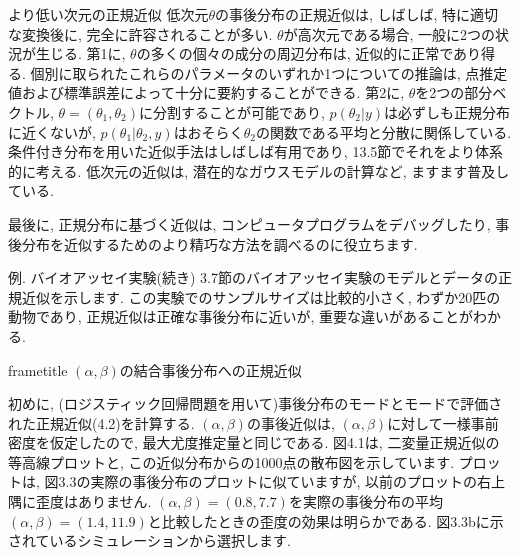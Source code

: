 \documentclass[10pt,dvipdfmx,a4]{beamer}
\newcommand{\dbox}[1]{\begin{beamercolorbox}[wd=122mm, sep=0pt, shadow=false, rounded=false]{frametitle} { #1}\end{beamercolorbox}}
\begin{document}
\begin{frame}{より低い次元の正規近似}
低次元$\theta$の事後分布の正規近似は, しばしば, 特に適切な変換後に, 完全に許容されることが多い.
$\theta$が高次元である場合, 一般に2つの状況が生じる.
第1に, $\theta$の多くの個々の成分の周辺分布は, 近似的に正常であり得る.
個別に取られたこれらのパラメータのいずれか1つについての推論は, 点推定値および標準誤差によって十分に要約することができる.
第2に, $\theta$を2つの部分ベクトル, $\theta=(\theta_1, \theta_2)$に分割することが可能であり, $p(\theta_2|y)$は必ずしも正規分布に近くないが, $p(\theta_1|\theta_2, y)$はおそらく$\theta_2$の関数である平均と分散に関係している.
条件付き分布を用いた近似手法はしばしば有用であり, 13.5節でそれをより体系的に考える.
低次元の近似は, 潜在的なガウスモデルの計算など, ますます普及している.

最後に, 正規分布に基づく近似は, コンピュータプログラムをデバッグしたり, 事後分布を近似するためのより精巧な方法を調べるのに役立ちます.
\end{frame}


\begin{frame}{例. バイオアッセイ実験(続き)}
3.7節のバイオアッセイ実験のモデルとデータの正規近似を示します.
この実験でのサンプルサイズは比較的小さく, わずか20匹の動物であり, 正規近似は正確な事後分布に近いが, 重要な違いがあることがわかる.

\dbox{$(\alpha,\beta)$の結合事後分布への正規近似}

初めに, (ロジスティック回帰問題を用いて)事後分布のモードとモードで評価された正規近似(4.2)を計算する.
$(\alpha,\beta)$の事後近似は, $(\alpha,\beta)$に対して一様事前密度を仮定したので, 最大尤度推定量と同じである.
図4.1は, 二変量正規近似の等高線プロットと, この近似分布からの1000点の散布図を示しています.
プロットは, 図3.3の実際の事後分布のプロットに似ていますが, 以前のプロットの右上隅に歪度はありません.
$(\alpha,\beta)=(0.8, 7.7)$を実際の事後分布の平均$(\alpha,\beta)=(1.4, 11.9)$と比較したときの歪度の効果は明らかである.
図3.3bに示されているシミュレーションから選択します.
\end{frame}

\end{document}
